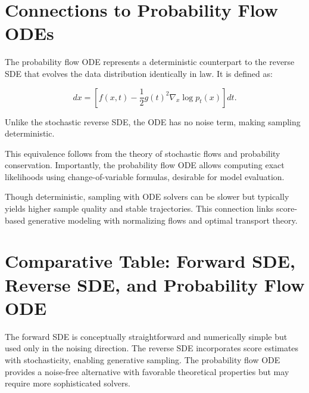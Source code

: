 \documentclass[a4paper,12pt,oneside]{memoir}
\begin{document}
\section{Connections to Probability Flow ODEs}

The probability flow ODE represents a deterministic counterpart to the reverse SDE that evolves the data distribution identically in law. It is defined as:

\[
dx = \left[ f(x,t) - \frac{1}{2} g(t)^2 \nabla_x \log p_t(x) \right] dt.
\]

Unlike the stochastic reverse SDE, the ODE has no noise term, making sampling deterministic.

This equivalence follows from the theory of stochastic flows and probability conservation. Importantly, the probability flow ODE allows computing exact likelihoods using change-of-variable formulas, desirable for model evaluation.

Though deterministic, sampling with ODE solvers can be slower but typically yields higher sample quality and stable trajectories. This connection links score-based generative modeling with normalizing flows and optimal transport theory.

\section{Comparative Table: Forward SDE, Reverse SDE, and Probability Flow ODE}

\begin{table}[h]
\centering
{}
\caption{Comparison of Forward and Reverse Diffusion Processes}
\end{table}

The forward SDE is conceptually straightforward and numerically simple but used only in the noising direction. The reverse SDE incorporates score estimates with stochasticity, enabling generative sampling. The probability flow ODE provides a noise-free alternative with favorable theoretical properties but may require more sophisticated solvers.
\end{document}
